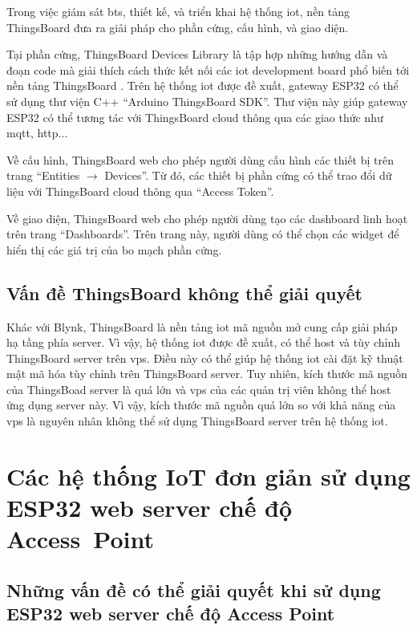 Trong việc giám sát \acrshort{bts}, thiết kế, và triển khai hệ thống \acrshort{iot}, nền tảng ThingsBoard đưa ra giải pháp cho phần cứng, cấu hình, và giao diện.

Tại phần cứng, ThingsBoard Devices Library là tập hợp những hướng dẫn và đoạn code mà giải thích cách thức kết nối các \acrshort{iot} development board phổ biến tới nền tảng ThingsBoard \cite{ThingsBoard-Devices-Lib-Overview}. Trên hệ thống \acrshort{iot} được đề xuất, gateway ESP32 có thể sử dụng thư viện C++ ``Arduino ThingsBoard SDK''. Thư viện này giúp gateway ESP32 có thể tương tác với ThingsBoard cloud thông qua các giao thức như \acrshort{mqtt}, \acrfull{http}...

Về cấu hình, ThingsBoard web cho phép người dùng cấu hình các thiết bị trên trang ``Entities $\rightarrow$ Devices''. Từ đó, các thiết bị phần cứng có thể trao đổi dữ liệu với ThingsBoard cloud thông qua ``Access Token''.

Về giao diện, ThingsBoard web cho phép người dùng tạo các dashboard linh hoạt trên trang ``Dashboards''. Trên trang này, người dùng có thể chọn các widget để hiển thị các giá trị của bo mạch phần cứng.

\subsection{Vấn đề ThingsBoard không thể giải quyết}

Khác với Blynk, ThingsBoard là nền tảng \acrshort{iot} mã nguồn mở cung cấp giải pháp hạ tầng phía server. Vì vậy, hệ thống \acrshort{iot} được đề xuất, có thể host và tùy chỉnh ThingsBoard server trên \acrshort{vps}. Điều này có thể giúp hệ thống \acrshort{iot} cài đặt kỹ thuật mật mã hóa tùy chỉnh trên ThingsBoard server. Tuy nhiên, kích thước mã nguồn của ThingsBoad server là quá lớn và \acrshort{vps} của các quản trị viên không thể host ứng dụng server này. Vì vậy, kích thước mã nguồn quá lớn so với khả năng của \acrshort{vps} là nguyên nhân không thể sử dụng ThingsBoard server trên hệ thống \acrshort{iot}.

\section{Các hệ thống IoT đơn giản sử dụng ESP32 web server chế độ Access~Point}

\subsection{Những vấn đề có thể giải quyết khi sử dụng ESP32 web server chế độ Access Point}

